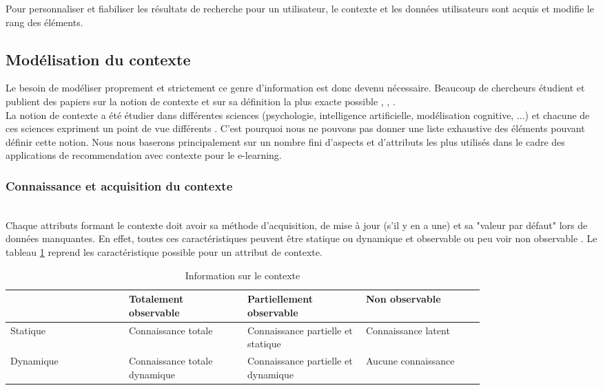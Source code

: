 \documentclass[conference]{./sty/IEEEtran}
\begin{document}
Pour personnaliser et fiabiliser les résultats de recherche pour un
utilisateur, le contexte et les données utilisateurs sont acquis et modifie le
rang des éléments. \\

\subsection{Modélisation du contexte}

Le besoin de modéliser proprement et strictement ce genre d'information est
donc devenu nécessaire. Beaucoup de chercheurs étudient et publient des papiers
sur la notion de contexte et sur sa définition la plus exacte possible
\cite{DBLP:journals/tlt/VerbertMOWDBD12},
\cite{DBLP:reference/rsh/AdomaviciusT11},
\cite{DBLP:journals/aim/AdomaviciusMRT11}. \\

La notion de contexte a été étudier dans différentes sciences (psychologie,
intelligence artificielle, modélisation cognitive, ...) et chacune de ces
sciences expriment un point de vue différents
\cite{DBLP:reference/rsh/AdomaviciusT11}. C'est pourquoi nous ne pouvons pas
donner une liste exhaustive des éléments pouvant définir cette notion. Nous
nous baserons principalement sur un nombre fini d'aspects et d'attributs les
plus utilisés dans le cadre des applications de recommendation avec contexte
pour le e-learning. \\


\subsubsection{Connaissance et acquisition du contexte}
~\\
Chaque attributs formant le contexte doit avoir sa méthode d'acquisition, de
mise à jour (s'il y en a une) et sa "valeur par défaut" lors de données
manquantes. En effet, toutes ces caractéristiques peuvent être statique ou
dynamique et observable ou peu voir non observable
\cite{DBLP:journals/aim/AdomaviciusMRT11}. Le tableau
\ref{tab:update_observability_context} reprend les caractéristique possible
pour un attribut de contexte. \\

\begin{table}
  \caption{\label{tab:update_observability_context} Information sur le contexte}
  \begin{tabular}{|p{0.20\linewidth}|p{0.20\linewidth}|p{0.20\linewidth}|p{0.20\linewidth}|}
    \hline
    ~ & Totalement observable & Partiellement observable & Non observable \\ \hline
    Statique & Connaissance totale & Connaissance partielle et statique & Connaissance latent \\ \hline
    Dynamique & Connaissance totale dynamique & Connaissance partielle et dynamique & Aucune connaissance \\ \hline
  \end{tabular}
\end{table}
\end{document}
